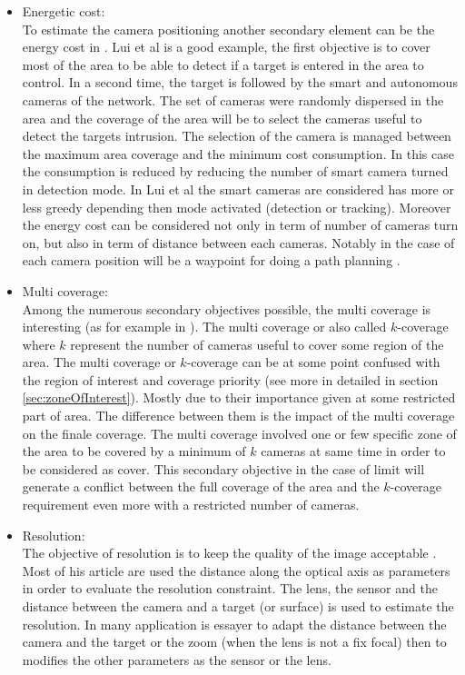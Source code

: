 \begin{itemize}
\item  Energetic cost:
\\ To estimate the camera positioning another secondary element can be the energy cost in \cite{38*liu2010,42*bulusu2001}. Lui et al \cite{38*liu2010} is a good example, the first objective is to cover most of the area to be able to detect if a target is entered in the area to control. In a second time, the target is followed by  the smart and autonomous cameras of the network. The set of cameras were randomly dispersed in the area and the coverage of the area will be to select the cameras useful to detect the targets intrusion. The selection of the camera is managed between the maximum area coverage and the minimum cost consumption. In this case the consumption is reduced by reducing the number of smart camera turned in detection mode. In Lui et al \cite{38*liu2010} the smart cameras are considered has more or less greedy depending then mode activated (detection or tracking). Moreover the energy cost can be considered not only in term of number of cameras turn on, but also in term of distance between each cameras. Notably in the case of each camera position will be a waypoint for doing a path planning \cite{191*di2016,218*meiting2007}.  
\\
\item Multi coverage:\\
 Among the numerous secondary objectives possible, the multi coverage is interesting (as for example in \cite{149*mavrinac2013,151*zhao2013,152*wang2009,174*zhang2016,175*medhi2013}). The multi coverage or also called $k$-coverage where $k$ represent the number of cameras useful to cover some region of the area. The multi coverage or $k$-coverage can be at some point confused with the region of interest and coverage priority (see more in detailed in section \ref{sec:zoneOfInterest}). Mostly due to their importance given at some restricted part of area. The difference between them is the impact of the multi coverage on the finale coverage. The multi coverage involved one or few specific zone of the area to be covered by a minimum of $k$ cameras at same time in order to be considered as cover. This secondary objective in the case of limit will generate a conflict between the full coverage of the area and the $k$-coverage requirement even more with a restricted number of cameras. 
\\ 
\item  Resolution:\\ The objective of resolution is to keep the quality of the image acceptable \cite{27*bodor2005,33*reddy2012,171*horster2006,152*wang2009,43*erdem2006}. Most of his article are used the distance along the optical axis as parameters in order to evaluate the resolution constraint. The lens, the sensor and the distance between the camera  and a target (or surface) is used to estimate the resolution. In many application is essayer to adapt the distance between the camera and the target or the zoom (when the lens is not a fix focal) then to modifies the other parameters as the sensor or the lens.\\

\end{itemize}
